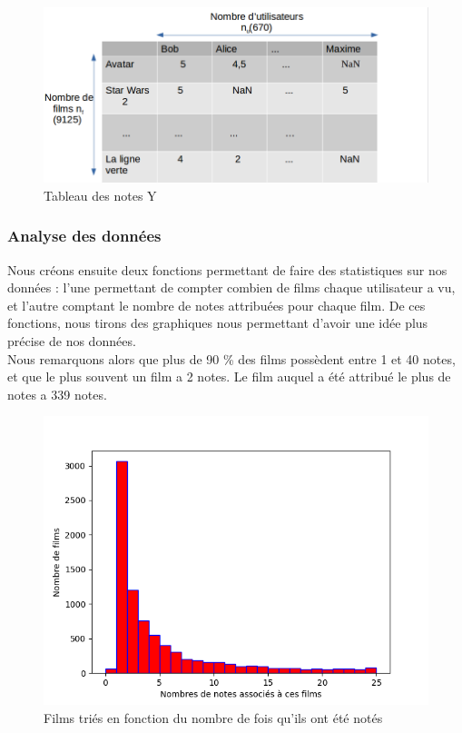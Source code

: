 \documentclass[a4paper,10pt]{article}
\begin{document}
\begin{figure}[H]
  \centering
  \includegraphics[scale=0.4]{Ynew.png}
  \caption{Tableau des notes Y}
\end{figure}

\subsubsection{Analyse des données}

Nous créons ensuite deux fonctions permettant de faire des statistiques sur nos données : l’une permettant de compter combien de films chaque utilisateur a vu, et l’autre comptant le nombre de notes attribuées pour chaque film. De ces fonctions, nous tirons des graphiques nous permettant d'avoir une idée plus précise de nos données.\\
Nous remarquons alors que plus de 90 \% des films possèdent entre 1 et 40 notes, et que le plus souvent un film a 2 notes. Le film auquel a été attribué le plus de notes a 339 notes.

\begin{figure}[H]
  \centering
\includegraphics[scale=0.5]{hist2.png}
\caption{Films triés en fonction du nombre de fois qu'ils ont été notés}
\end{figure}
\end{document}

